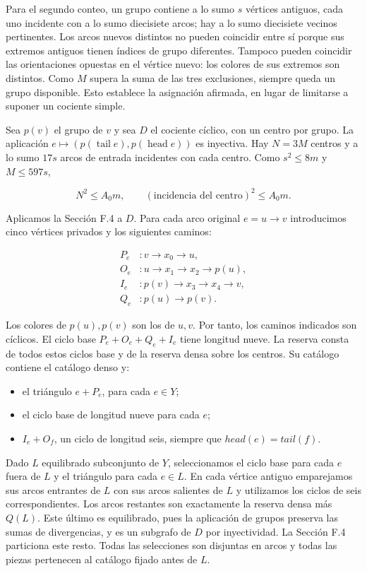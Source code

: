 \documentclass[spanish,11pt,a4paper]{article}
\providecommand{\tightlist}{\setlength{\itemsep}{0pt}\setlength{\parskip}{0pt}}
\begin{document}
Para el segundo conteo, un grupo contiene a lo sumo \(s\) vértices antiguos, cada uno incidente con a lo sumo diecisiete arcos; hay a lo sumo diecisiete vecinos pertinentes. Los arcos nuevos distintos no pueden coincidir entre sí porque sus extremos antiguos tienen índices de grupo diferentes. Tampoco pueden coincidir las orientaciones opuestas en el vértice nuevo: los colores de sus extremos son distintos. Como \(M\) supera la suma de las tres exclusiones, siempre queda un grupo disponible. Esto establece la asignación afirmada, en lugar de limitarse a suponer un cociente simple.

Sea \(p(v)\) el grupo de \(v\) y sea \(D\) el cociente cíclico, con un centro por grupo. La aplicación \(e\mapsto(p(\operatorname{tail}e),p(\operatorname{head}e))\) es inyectiva. Hay \(N=3M\) centros y a lo sumo \(17s\) arcos de entrada incidentes con cada centro. Como \(s^{2}\le 8m\) y \(M\le 597s\),

\[N^2\le A_0m,\qquad(\text{incidencia del centro})^2\le A_0m.\tag{F.8}\]

Aplicamos la Sección F.4 a \(D\). Para cada arco original \(e=u\to v\) introducimos cinco vértices privados y los siguientes caminos:

\[\begin{aligned}P_e&:v\to x_0\to u,\\O_e&:u\to x_1\to x_2\to p(u),\\I_e&:p(v)\to x_3\to x_4\to v,\\Q_e&:p(u)\to p(v).\end{aligned}\]

Los colores de \(p(u),p(v)\) son los de \(u,v\). Por tanto, los caminos indicados son cíclicos. El ciclo base \(P_{e}+O_{e}+Q_{e}+I_{e}\) tiene longitud nueve. La reserva consta de todos estos ciclos base y de la reserva densa sobre los centros. Su catálogo contiene el catálogo denso y:

\begin{itemize}
\tightlist
\item
  el triángulo \(e+P_{e}\), para cada \(e\in Y\);
\item
  el ciclo base de longitud nueve para cada \(e\);
\item
  \(I_{e}+O_{f}\), un ciclo de longitud seis, siempre que \(head(e)=tail(f)\).
\end{itemize}

Dado \(L\) equilibrado subconjunto de \(Y\), seleccionamos el ciclo base para cada \(e\) fuera de \(L\) y el triángulo para cada \(e\in L\). En cada vértice antiguo emparejamos sus arcos entrantes de \(L\) con sus arcos salientes de \(L\) y utilizamos los ciclos de seis correspondientes. Los arcos restantes son exactamente la reserva densa más \(Q(L)\). Este último es equilibrado, pues la aplicación de grupos preserva las sumas de divergencias, y es un subgrafo de \(D\) por inyectividad. La Sección F.4 particiona este resto. Todas las selecciones son disjuntas en arcos y todas las piezas pertenecen al catálogo fijado antes de \(L\).
\end{document}
